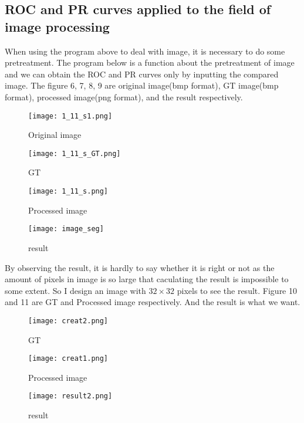 \documentclass[a4paper,12pt]{article}
\begin{document}
\subsection{ROC and PR curves applied to the field of image processing}

When using the program above to deal with image, it is necessary to do some pretreatment. The program below is a function about the pretreatment of image and we can obtain the ROC and PR curves only by inputting the compared image. The figure 6, 7, 8, 9 are original image(bmp format), GT image(bmp format), processed image(png format), and the result respectively. 

\begin{figure}[!ht]
\centering\texttt{[image: 1\_11\_s1.png]}
\caption{Original image}
\end{figure} 

\begin{figure}[!ht]
\begin{minipage}[t]{0.5\textwidth}
\centering\texttt{[image: 1\_11\_s\_GT.png]}
\caption{GT}
\end{minipage} 
\begin{minipage}[t]{0.5\textwidth}
\texttt{[image: 1\_11\_s.png]}
\caption{Processed image}
\end{minipage}
\end{figure} 

\begin{figure}[!ht]
\centering\texttt{[image: image\_seg]}
\caption{result}
\end{figure} 

By observing the result, it is hardly to say whether it is right or not as the amount of pixels in image is so large that caculating the result is impossible to some extent. So I design an image with $32\times32$ pixels to see the result. Figure 10 and 11 are GT and Processed image respectively. And the result is what we want.


\begin{figure}[!ht]
\begin{minipage}[t]{0.5\textwidth}
\texttt{[image: creat2.png]}
\caption{GT}
\end{minipage}
\begin{minipage}[t]{0.5\textwidth}
\centering\texttt{[image: creat1.png]}
\caption{Processed image}
\end{minipage}
\end{figure} 
\begin{figure}[!ht]
\centering\texttt{[image: result2.png]}
\caption{result}
\end{figure}
\end{document}
